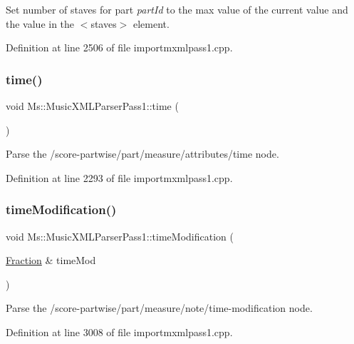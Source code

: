 Set number of staves for part {\itshape part\+Id} to the max value of the current value and the value in the $<$staves$>$ element. 

Definition at line 2506 of file importmxmlpass1.\+cpp.

\mbox{\label{class_ms_1_1_music_x_m_l_parser_pass1_abb54ab145dbe05ccc4ef4a04ca0d94bd}} 
\subsubsection{\texorpdfstring{time()}{time()}}
{\footnotesize\ttfamily void Ms\+::\+Music\+X\+M\+L\+Parser\+Pass1\+::time (\begin{DoxyParamCaption}{ }\end{DoxyParamCaption})}

Parse the /score-\/partwise/part/measure/attributes/time node. 

Definition at line 2293 of file importmxmlpass1.\+cpp.

\mbox{\label{class_ms_1_1_music_x_m_l_parser_pass1_ac9feadbc3a95595e36c5ed1287beb665}} 
\subsubsection{\texorpdfstring{time\+Modification()}{timeModification()}}
{\footnotesize\ttfamily void Ms\+::\+Music\+X\+M\+L\+Parser\+Pass1\+::time\+Modification (\begin{DoxyParamCaption}\item[{\hyperlink{class_ms_1_1_fraction}{Fraction} \&}]{time\+Mod }\end{DoxyParamCaption})}

Parse the /score-\/partwise/part/measure/note/time-\/modification node. 

Definition at line 3008 of file importmxmlpass1.\+cpp.

\mbox{\label{class_ms_1_1_music_x_m_l_parser_pass1_abc6e2042bc02ff42b643730142f87202}} 
